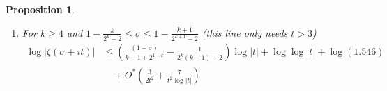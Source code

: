 \documentclass[10pt,english,letter, reqno]{amsart}
\newcommand{\Ostar}{O^{\ast}}
\theoremstyle{plain}
\newtheorem{proposition}[theorem]{Proposition}
\theoremstyle{definition}
\begin{document}
\begin{proposition}
\begin{enumerate}
\begin{align*}
     \log|\zeta(\sigma+it)| &\leq  \left(\frac{4(1-\sigma)}{9}-\frac{1}{18} \right)\log|t|
                 +\log\log|t| +   \frac{14}{3}\left(\frac{5}{7}-\sigma\right)\log(0.611) \\&\quad+  \frac{14}{3}\left(\sigma-\frac{1}{2}\right)\log(1.546)   \\&\quad+ \Ostar\!\left(\frac{3}{2t^2} + \frac{579}{4t^2\log|t|}\right) \\
     \log|\zeta(\sigma+it)| &\leq  \left(\frac{4(1-\sigma)}{9}-\frac{1}{18} \right)\log|t|
                 +\log\log|t| \\&\quad +  \frac{14}{3}\left(\frac{5}{7}-\sigma\right)\log\left(0.470795  + \frac{4.04972}{\log|t|}\right) +\frac{14}{3}\left(\sigma-\frac{1}{2}\right)\log(1.546)\\&\quad   +  \Ostar\!\left(\frac{3}{2t^2} + \frac{567}{4t^2\log|t|}\right)
     \end{align*}
    \item For  $k\geq 4$ and $1-\frac{k}{2^k-2} \leq \sigma \leq 1-\frac{k+1}{2^{k+1}-2}$ (this line only needs $t>3$)
        \begin{align*} \log|\zeta(\sigma+it)| &\leq  \left(\frac{(1-\sigma)}{k-1+2^{1-k}}-\frac{1}{2^k(k-1)+2} \right)\log|t|  +\log\log|t| + \log(1.546)\\&\quad +\Ostar\!\left(\frac{3}{2t^2} + \frac{7}{t^2\log|t|}\right)
       \end{align*}
\end{enumerate}
\end{proposition}
\end{document}
